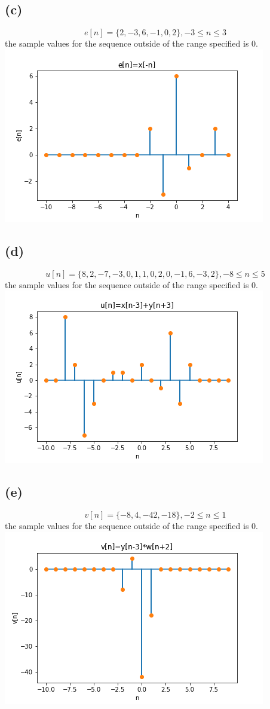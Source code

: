 \subsection*{(c)}
$$\boxed{e[n]=\{2, -3, 6, -1, 0, 2\}, -3\leq n \leq3}$$ 
the sample values for the sequence outside of the range specified
is 0.\\
\includegraphics[scale=0.5]{e.png}
\subsection*{(d)}
$$\boxed{u[n]=\{8, 2, -7, -3, 0, 1, 1, 0, 2, 0, -1, 6, -3, 2\}, 
-8\leq n \leq5}$$ 
the sample values for the sequence outside of the range specified
is 0.\\
\includegraphics[scale=0.5]{u.png}
\subsection*{(e)}
$$\boxed{v[n]=\{-8, 4, -42, -18\}, 
-2\leq n \leq1}$$ 
the sample values for the sequence outside of the range specified
is 0.\\
\includegraphics[scale=0.5]{v.png}
